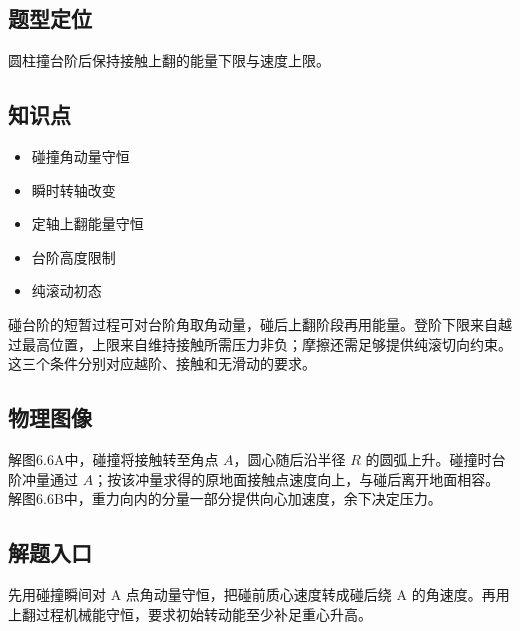 \documentclass[UTF8,fontset=fandol,a4paper,11pt]{ctexart}
\providecommand{\tightlist}{\setlength{\itemsep}{0pt}\setlength{\parskip}{0pt}}
\begin{document}


\subsection*{题型定位}

圆柱撞台阶后保持接触上翻的能量下限与速度上限。



\subsection*{知识点}

\begin{itemize}
\tightlist
\item
  碰撞角动量守恒
\item
  瞬时转轴改变
\item
  定轴上翻能量守恒
\item
  台阶高度限制
\item
  纯滚动初态
\end{itemize}

碰台阶的短暂过程可对台阶角取角动量，碰后上翻阶段再用能量。登阶下限来自越过最高位置，上限来自维持接触所需压力非负；摩擦还需足够提供纯滚切向约束。这三个条件分别对应越阶、接触和无滑动的要求。




\subsection*{物理图像}

解图6.6A中，碰撞将接触转至角点 $A$，圆心随后沿半径 $R$ 的圆弧上升。碰撞时台阶冲量通过 $A$；按该冲量求得的原地面接触点速度向上，与碰后离开地面相容。解图6.6B中，重力向内的分量一部分提供向心加速度，余下决定压力。



\subsection*{解题入口}

先用碰撞瞬间对 A 点角动量守恒，把碰前质心速度转成碰后绕 A
的角速度。再用上翻过程机械能守恒，要求初始转动能至少补足重心升高。
\end{document}
